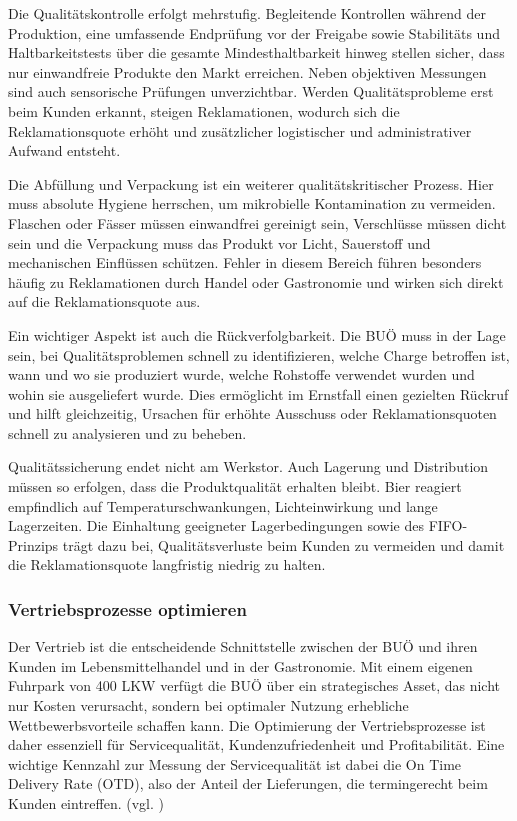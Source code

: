Die Qualitätskontrolle erfolgt mehrstufig. Begleitende Kontrollen während der Produktion, eine umfassende Endprüfung vor der Freigabe sowie Stabilitäts und Haltbarkeitstests über die gesamte Mindesthaltbarkeit hinweg stellen sicher, dass nur einwandfreie Produkte den Markt erreichen. Neben objektiven Messungen sind auch sensorische Prüfungen unverzichtbar. Werden Qualitätsprobleme erst beim Kunden erkannt, steigen Reklamationen, wodurch sich die Reklamationsquote erhöht und zusätzlicher logistischer und administrativer Aufwand entsteht.  

Die Abfüllung und Verpackung ist ein weiterer qualitätskritischer Prozess. Hier muss absolute Hygiene herrschen, um mikrobielle Kontamination zu vermeiden. Flaschen oder Fässer müssen einwandfrei gereinigt sein, Verschlüsse müssen dicht sein und die Verpackung muss das Produkt vor Licht, Sauerstoff und mechanischen Einflüssen schützen. Fehler in diesem Bereich führen besonders häufig zu Reklamationen durch Handel oder Gastronomie und wirken sich direkt auf die Reklamationsquote aus.  

Ein wichtiger Aspekt ist auch die Rückverfolgbarkeit. Die BUÖ muss in der Lage sein, bei Qualitätsproblemen schnell zu identifizieren, welche Charge betroffen ist, wann und wo sie produziert wurde, welche Rohstoffe verwendet wurden und wohin sie ausgeliefert wurde. Dies ermöglicht im Ernstfall einen gezielten Rückruf und hilft gleichzeitig, Ursachen für erhöhte Ausschuss oder Reklamationsquoten schnell zu analysieren und zu beheben.  

Qualitätssicherung endet nicht am Werkstor. Auch Lagerung und Distribution müssen so erfolgen, dass die Produktqualität erhalten bleibt. Bier reagiert empfindlich auf Temperaturschwankungen, Lichteinwirkung und lange Lagerzeiten. Die Einhaltung geeigneter Lagerbedingungen sowie des FIFO-Prinzips trägt dazu bei, Qualitätsverluste beim Kunden zu vermeiden und damit die Reklamationsquote langfristig niedrig zu halten.  

\subsubsection{Vertriebsprozesse optimieren}  

Der Vertrieb ist die entscheidende Schnittstelle zwischen der BUÖ und ihren Kunden im Lebensmittelhandel und in der Gastronomie. Mit einem eigenen Fuhrpark von 400 LKW verfügt die BUÖ über ein strategisches Asset, das nicht nur Kosten verursacht, sondern bei optimaler Nutzung erhebliche Wettbewerbsvorteile schaffen kann. Die Optimierung der Vertriebsprozesse ist daher essenziell für Servicequalität, Kundenzufriedenheit und Profitabilität. Eine wichtige Kennzahl zur Messung der Servicequalität ist dabei die On Time Delivery Rate (OTD), also der Anteil der Lieferungen, die termingerecht beim Kunden eintreffen. (vgl. \cite{ODT}) 

